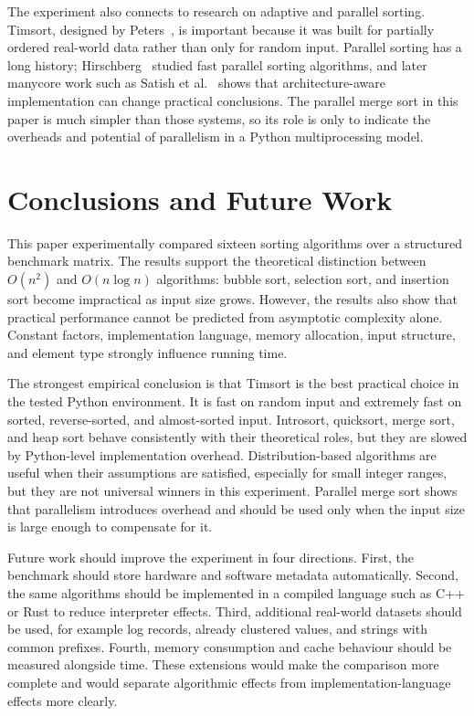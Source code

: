 \documentclass[11pt,a4paper]{article}
\begin{document}
The experiment also connects to research on adaptive and parallel sorting. Timsort, designed by Peters~\cite{peters2002}, is important because it was built for partially ordered real-world data rather than only for random input. Parallel sorting has a long history; Hirschberg~\cite{hirschberg1978} studied fast parallel sorting algorithms, and later manycore work such as Satish et al.~\cite{satish2009} shows that architecture-aware implementation can change practical conclusions. The parallel merge sort in this paper is much simpler than those systems, so its role is only to indicate the overheads and potential of parallelism in a Python multiprocessing model.

\section{Conclusions and Future Work}\label{sec:conclusion}

This paper experimentally compared sixteen sorting algorithms over a structured benchmark matrix. The results support the theoretical distinction between $O(n^2)$ and $O(n\log n)$ algorithms: bubble sort, selection sort, and insertion sort become impractical as input size grows. However, the results also show that practical performance cannot be predicted from asymptotic complexity alone. Constant factors, implementation language, memory allocation, input structure, and element type strongly influence running time.

The strongest empirical conclusion is that Timsort is the best practical choice in the tested Python environment. It is fast on random input and extremely fast on sorted, reverse-sorted, and almost-sorted input. Introsort, quicksort, merge sort, and heap sort behave consistently with their theoretical roles, but they are slowed by Python-level implementation overhead. Distribution-based algorithms are useful when their assumptions are satisfied, especially for small integer ranges, but they are not universal winners in this experiment. Parallel merge sort shows that parallelism introduces overhead and should be used only when the input size is large enough to compensate for it.

Future work should improve the experiment in four directions. First, the benchmark should store hardware and software metadata automatically. Second, the same algorithms should be implemented in a compiled language such as C++ or Rust to reduce interpreter effects. Third, additional real-world datasets should be used, for example log records, already clustered values, and strings with common prefixes. Fourth, memory consumption and cache behaviour should be measured alongside time. These extensions would make the comparison more complete and would separate algorithmic effects from implementation-language effects more clearly.
\end{document}
